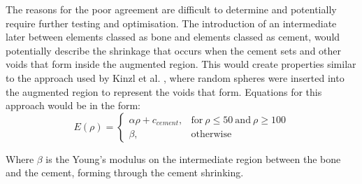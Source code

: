 The reasons for the poor agreement are difficult to determine and potentially
require further testing and optimisation. The introduction of an intermediate
later between elements classed as bone and elements classed as cement, would
potentially describe the shrinkage that occurs when the cement sets and other
voids that form inside the augmented region. This would create properties
similar to the approach used by Kinzl et al. \cite{kinzl2013experimentally},
where random spheres were inserted into the augmented region to represent the
voids that form. Equations for this approach would be in the form:
\begin{equation}
	E(\rho)= 
	\begin{cases}
	\alpha \rho + c_{cement}, & \text{for}\ \rho \leq 50\ \text{and}\ \rho \geq 100 \\
	\beta, & \text{otherwise}
	\end{cases}
\end{equation}

Where $\beta$ is the Young's modulus on the intermediate region between the
bone and the cement, forming through the cement shrinking.


%
